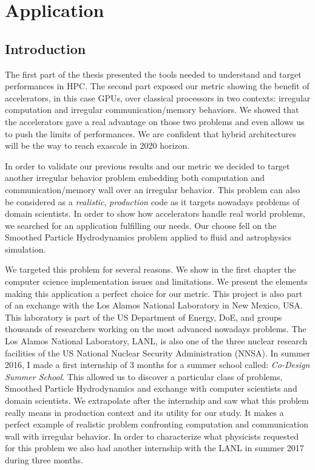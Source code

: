 \part{Application}

\chapter*{Introduction}
The first part of the thesis presented the tools needed to understand and target performances in HPC. 
The second part exposed our metric showing the benefit of accelerators, in this case GPUs, over classical processors in two contexts: irregular computation and irregular communication/memory behaviors.
We showed that the accelerators gave a real advantage on those two problems and even allows us to push the limits of performances.
We are confident that hybrid architectures will be the way to reach exascale in 2020 horizon.

In order to validate our previous results and our metric we decided to target another irregular behavior problem embedding both computation and communication/memory wall over an irregular behavior. 
This problem can also be considered as a \textit{realistic}, \textit{production} code as it targets nowadays problems of domain scientists. 
In order to show how accelerators handle real world problems, we searched for an application fulfilling our needs. 
Our choose fell on the Smoothed Particle Hydrodynamics problem applied to fluid and astrophysics simulation. 

We targeted this problem for several reasons. 
We show in the first chapter the computer science implementation issues and limitations.
We present the elements making this application a perfect choice for our metric.
This project is also part of an exchange with the Los Alamos National Laboratory in New Mexico, USA. 
This laboratory is part of the US Department of Energy, DoE, and groups thousands of researchers working on the most advanced nowadays problems.
The Los Alamos National Laboratory, LANL, is also one of the three nuclear research facilities of the US National Nuclear Security Administration (NNSA). 
In summer 2016, I made a first internship of 3 months for a summer school called: \textit{Co-Design Summer School}.
This allowed us to discover a particular class of problems, Smoothed Particle Hydrodynamics and exchange with computer scientists and domain scientists.
We extrapolate after the internship and saw what this problem really means in production context and its utility for our study. 
It makes a perfect example of realistic problem confronting computation and communication wall with irregular behavior. 
In order to characterize what physicists requested for this problem we also had another internship with the LANL in summer 2017 during three months. 

